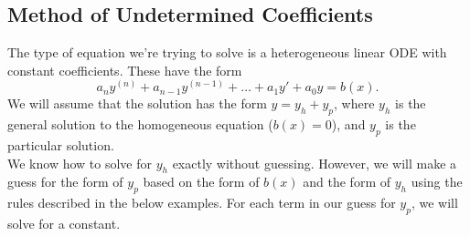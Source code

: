 \subsection{Method of Undetermined Coefficients}
\noindent
The type of equation we're trying to solve is a heterogeneous linear ODE with constant coefficients.
These have the form
\begin{equation*}
	a_ny^{(n)} + a_{n-1}y^{(n-1)} + \ldots + a_1y' + a_0y = b(x).
\end{equation*}
We will assume that the solution has the form $y = y_h + y_p$, where $y_h$ is the general solution to the homogeneous equation ($b(x) = 0$), and $y_p$ is the particular solution.\\

\noindent
We know how to solve for $y_h$ exactly without guessing.
However, we will make a guess for the form of $y_p$ based on the form of $b(x)$ and the form of $y_h$ using the rules described in the below examples.
For each term in our guess for $y_p$, we will solve for a constant.\\

